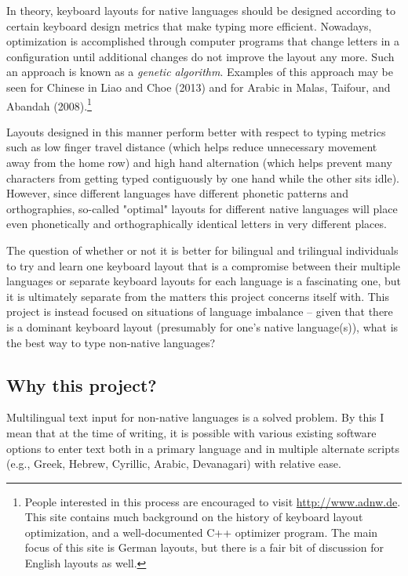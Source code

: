 \documentclass[11pt]{article}
\begin{document}
In theory, keyboard layouts for native languages should be designed according to certain keyboard design metrics that make typing more efficient. Nowadays, optimization is accomplished through computer programs that change letters in a configuration until additional changes do not improve the layout any more. Such an approach is known as a \emph{genetic algorithm}. Examples of this approach may be seen for Chinese in Liao and Choe (2013) and for Arabic in Malas, Taifour, and Abandah (2008).\footnote{People interested in this process are encouraged to visit \url{http://www.adnw.de}. This site contains much background on the history of keyboard layout optimization, and a well-documented C++ optimizer program. The main focus of this site is German layouts, but there is a fair bit of discussion for English layouts as well.}

Layouts designed in this manner perform better with respect to typing metrics such as low finger travel distance (which helps reduce unnecessary movement away from the home row) and high hand alternation (which helps prevent many characters from getting typed contiguously by one hand while the other sits idle). However, since different languages have different phonetic patterns and orthographies, so-called "optimal" layouts for different native languages will place even phonetically and orthographically identical letters in very different places.

The question of whether or not it is better for bilingual and trilingual individuals to try and learn one keyboard layout that is a compromise between their multiple languages or separate keyboard layouts for each language is a fascinating one, but it is ultimately separate from the matters this project concerns itself with. This project is instead focused on situations of language imbalance -- given that there is a dominant keyboard layout (presumably for one's native language(s)), what is the best way to type non-native languages?

\subsection{Why this project?}
\label{sec:org0e3ac61}

Multilingual text input for non-native languages is a solved problem. By this I mean that at the time of writing, it is possible with various existing software options to enter text both in a primary language and in multiple alternate scripts (e.g., Greek, Hebrew, Cyrillic, Arabic, Devanagari) with relative ease.
\end{document}
